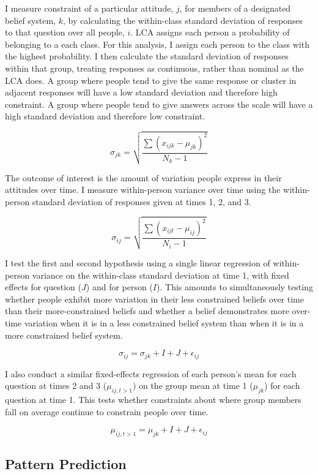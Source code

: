 \documentclass[12pt,]{article}
\begin{document}
I measure constraint of a particular attitude, \(j\), for members of a designated belief system, \(k\), by calculating the within-class standard deviation of responses to that question over all people, \(i\). LCA assigns each person a probability of belonging to a each class. For this analysis, I assign each person to the class with the highest probability. I then calculate the standard deviation of responses within that group, treating responses as continuous, rather than nominal as the LCA does. A group where people tend to give the same response or cluster in adjacent responses will have a low standard deviation and therefore high constraint. A group where people tend to give answers across the scale will have a high standard deviation and therefore low constraint.

\[ \sigma_{jk} = \sqrt{ \frac{\sum{(x_{ijk} - \mu_{jk})^2}}{N_k - 1}}  \]

The outcome of interest is the amount of variation people express in their attitudes over time. I measure within-person variance over time using the within-person standard deviation of responses given at times 1, 2, and 3.

\[ \sigma_{ij} = \sqrt{ \frac{\sum{(x_{ijt} - \mu_{ij})^2}}{N_{i} - 1}}  \]

I test the first and second hypothesis using a single linear regression of within-person variance on the within-class standard deviation at time 1, with fixed effects for question (\(J\)) and for person (\(I\)). This amounts to simultaneously testing whether people exhibit more variation in their less constrained beliefs over time than their more-constrained beliefs and whether a belief demonstrates more over-time variation when it is in a less constrained belief system than when it is in a more constrained belief system.

\[ \sigma_{ij} = \sigma_{jk} + I + J + \epsilon_{ij} \]

I also conduct a similar fixed-effects regression of each person's mean for each question at times 2 and 3 (\(\mu_{ij,t>1}\)) on the group mean at time 1 (\(\mu_{jk}\)) for each question at time 1. This tests whether constraints about where group members fall on average continue to constrain people over time.

\[ \mu_{ij,t>1} = \mu_{jk} + I + J + \epsilon_{ij} \]

\hypertarget{pattern-prediction}{%
\subsection{Pattern Prediction}\label{pattern-prediction}}
\end{document}
